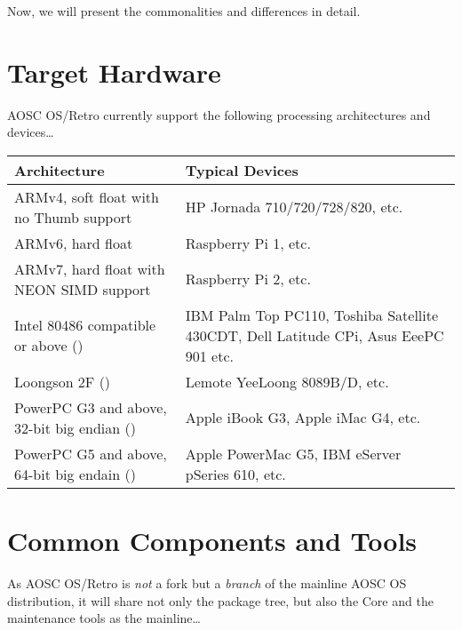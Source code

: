     Now, we will present the commonalities and differences in detail.




    \section{Target Hardware}
    
    AOSC OS/Retro currently support the following processing architectures and devices\ldots
    \pagebreak

    \begin{tabu} {XX}
        \hline
        {Architecture} &
        {Typical Devices}\\
        \hline
        {ARMv4, soft float with no Thumb support}
            & {HP Jornada 710/720/728/820, etc.}\\
        {ARMv6, hard float}
            & {Raspberry Pi 1, etc.}\\
        {ARMv7, hard float with NEON SIMD support}
            & {Raspberry Pi 2, etc.}\\
        {Intel 80486 compatible or above ()}
            & {IBM Palm Top PC110, Toshiba Satellite 430CDT, Dell Latitude CPi, Asus EeePC 901 etc.}\\
        {Loongson 2F ()}
            & {Lemote YeeLoong 8089B/D, etc.}\\
        {PowerPC G3 and above, 32-bit big endian ()}
            & {Apple iBook G3, Apple iMac G4, etc.}\\
        {PowerPC G5 and above, 64-bit big endain ()}
            & {Apple PowerMac G5, IBM eServer pSeries 610, etc.}\\
        \hline
    \end{tabu}

    \section{Common Components and Tools}
    
    As AOSC OS/Retro is \textit{not} a fork but a \textit{branch} of the mainline AOSC OS distribution,
    it will share not only the package tree, but also the Core and the maintenance tools as the mainline\ldots
    
